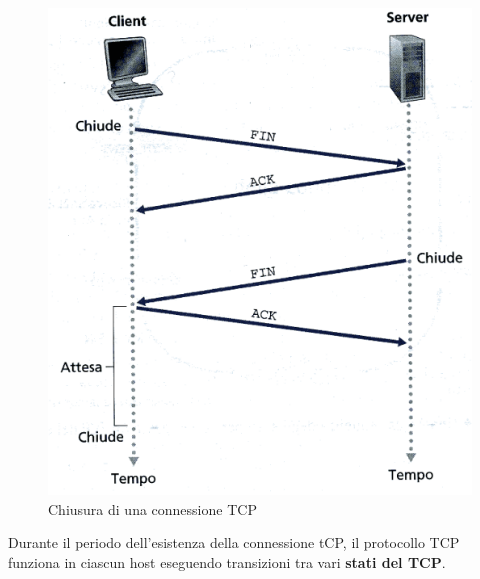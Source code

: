 \documentclass[11pt,a4paper]{book}
\begin{document}
\begin{figure}
	\includegraphics[scale=0.6]{img/036.png}
	\caption{Chiusura di una connessione TCP}
\end{figure}
Durante il periodo dell'esistenza della connessione tCP, il protocollo TCP funziona in ciascun host eseguendo transizioni tra vari \textbf{stati del TCP}. 
\end{document}
